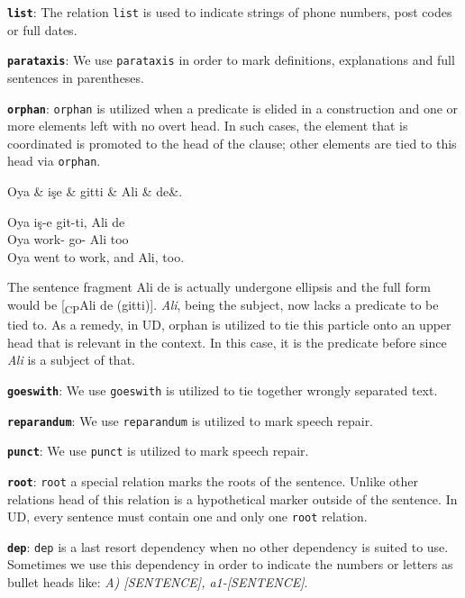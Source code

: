 \documentclass[11pt,a4paper]{article}
\begin{document}
\textbf{\texttt{list}}:
The relation \texttt{list} is used to indicate strings of phone numbers, post codes or full dates.

\textbf{\texttt{parataxis}}:
We use \texttt{parataxis} in order to mark definitions, explanations and full sentences in parentheses.

\textbf{\texttt{orphan}}:
\texttt{orphan} is utilized when a predicate is elided in a construction and one or more elements left with no overt head. In such cases, the element that is coordinated is promoted to the head of the clause; other elements are tied to this head via \texttt{orphan}.

\begin{exe}
\ex \label{advmod:emph}
\begin{dependency}
\begin{deptext}[column sep=0.24cm]
Oya \& işe \& gitti \& Ali \& de\&. \\
\end{deptext}
\end{dependency}
\gll Oya iş-e git-ti, Ali de  \\
Oya work-\Dat{} go-\Pst{} Ali too  \\
\glt Oya went to work, and Ali, too.
\end{exe}

The sentence fragment Ali de is actually undergone ellipsis and the full form would be [\textsubscript{CP}Ali de (gitti)]. \textit{Ali}, being the subject, now lacks a predicate to be tied to. As a remedy, in UD, orphan is utilized to tie this particle onto an upper head that is relevant in the context. In this case, it is the predicate before since \textit{Ali} is a subject of that.

\textbf{\texttt{goeswith}}:
We use \texttt{goeswith} is utilized to tie together wrongly separated text.

\textbf{\texttt{reparandum}}:
We use \texttt{reparandum} is utilized to mark speech repair.

\textbf{\texttt{punct}}:
We use \texttt{punct} is utilized to mark speech repair.

\textbf{\texttt{root}}:
\texttt{root} a special relation marks the roots of the sentence. Unlike other relations head of this relation is a hypothetical marker outside of the sentence. In UD, every sentence must contain one and only one \texttt{root} relation.

\textbf{\texttt{dep}}:
\texttt{dep} is a last resort dependency when no other dependency is suited to use. Sometimes we use this dependency in order to indicate the numbers or letters as bullet heads like: \textit{A) [SENTENCE], a1-[SENTENCE]}.



\end{document}
